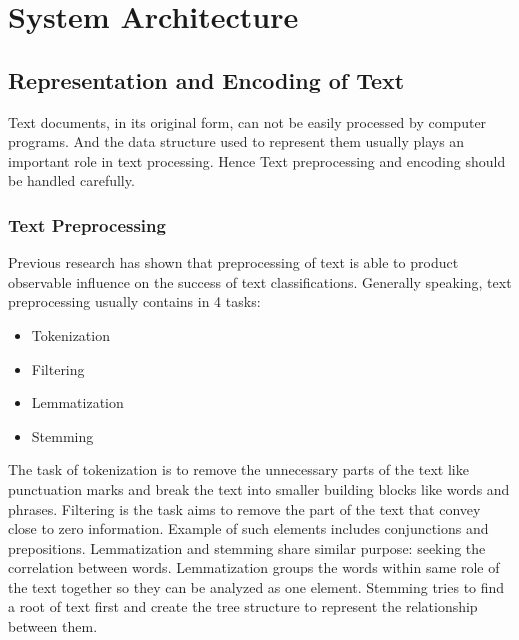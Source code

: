 \documentclass[conference]{IEEEtran}
\begin{document}
\section{System Architecture}
\label{model}
\subsection{Representation and Encoding of Text}
\label{model:represent}
    Text documents, in its original form, can not be easily processed
    by computer programs. And the data structure used to represent them usually plays 
    an important role in text processing\cite{hotho2005brief,allahyari2017brief}. Hence
    Text preprocessing and encoding should be handled carefully.
    
\subsubsection{Text Preprocessing}
\label{model:represent:preprocess}
    Previous research has shown that preprocessing of text is able to product observable
    influence on the success of text classifications\cite{uysal2014impact}.
    Generally speaking, text preprocessing usually contains in 4 
    tasks\cite{allahyari2017brief}:
    \begin{itemize}
        \item Tokenization
        \item Filtering
        \item Lemmatization
        \item Stemming
    \end{itemize}
    
    The task of tokenization is to remove the unnecessary parts of the text like 
    punctuation marks and break the text into smaller building blocks like words and 
    phrases\cite{webster1992tokenization}. 
    Filtering is the task aims to remove the part of the text that convey close to zero 
    information. Example of such elements includes conjunctions and 
    prepositions\cite{silva2003importance}.
    Lemmatization and stemming share similar purpose: seeking the correlation between words.
    Lemmatization groups the words within same role of the text together so they can be 
    analyzed as one element. Stemming tries to find a root of text first and create the tree
    structure to represent the relationship between them\cite{hull1996stemming}.
\end{document}
